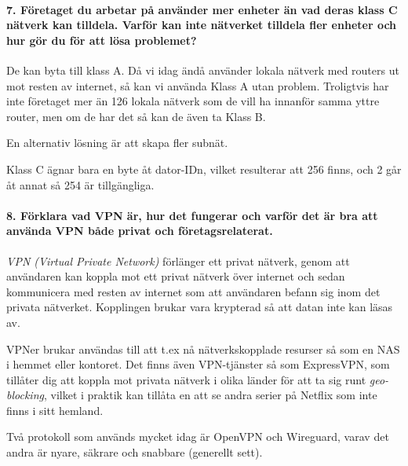 \paragraph{7. Företaget du arbetar på använder mer enheter än vad deras klass C nätverk kan tilldela. Varför kan inte nätverket tilldela fler enheter och hur gör du för att lösa problemet?}

De kan byta till klass A. Då vi idag ändå använder lokala nätverk med routers ut mot resten av internet, så kan vi använda Klass A utan problem. Troligtvis har inte företaget mer än 126 lokala nätverk som de vill ha innanför samma yttre router, men om de har det så kan de även ta Klass B.

En alternativ lösning är att skapa fler subnät.

Klass C ägnar bara en byte åt dator-IDn, vilket resulterar att 256 finns, och 2 går åt annat så 254 är tillgängliga.

\paragraph{8. Förklara vad VPN är, hur det fungerar och varför det är bra att använda VPN både privat och företagsrelaterat.}

\textit{VPN (Virtual Private Network)} förlänger ett privat nätverk, genom att användaren kan koppla mot ett privat nätverk över internet och sedan kommunicera med resten av internet som att användaren befann sig inom det privata nätverket. Kopplingen brukar vara krypterad så att datan inte kan läsas av.

VPNer brukar användas till att t.ex nå nätverkskopplade resurser så som en NAS i hemmet eller kontoret. Det finns även VPN-tjänster så som ExpressVPN, som tillåter dig att koppla mot privata nätverk i olika länder för att ta sig runt \textit{geo-blocking}, vilket i praktik kan tillåta en att se andra serier på Netflix som inte finns i sitt hemland.

Två protokoll som används mycket idag är OpenVPN och Wireguard, varav det andra är nyare, säkrare och snabbare (generellt sett).
















